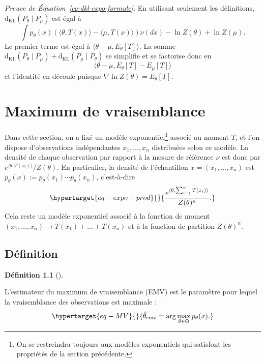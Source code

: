 \documentclass[
  10,
  letterpaper,
  DIV=11,
  numbers=noendperiod]{scrreport}
\newcommand{\dkl}{\mathrm{d}_{\mathrm{KL}}}
\newcommand{\emv}{\hat{\theta}_{\mathrm{emv}}}
\theoremstyle{plain}
\theoremstyle{definition}
\theoremstyle{plain}
\theoremstyle{definition}
\newtheorem{definition}{Définition}[chapter]
\theoremstyle{definition}
\theoremstyle{plain}
\theoremstyle{remark}
\begin{document}
\emph{Preuve de Équation~\ref{eq-dkl-expo-formule}.} En utilisant
seulement les définitions, \(\dkl(P_\theta \mid P_\mu)\) est égal à
\[\int p_\theta(x)(\langle \theta, T(x)\rangle - \langle \mu, T(x)\rangle) \nu(dx) - \ln Z(\theta) + \ln Z(\mu). \]
Le premier terme est égal à
\(\langle \theta - \mu, E_\theta[T]\rangle\). La somme
\(\dkl(P_\theta \mid P_\mu) + \dkl(P_\mu \mid P_\theta)\) se simplifie
et se factorise donc en
\[\langle \theta - \mu, E_\theta[T] - E_\mu[T]\rangle \] et l'identité
en découle puisque \(\nabla \ln Z(\theta) = E_\theta[T]\).


\hypertarget{maximum-de-vraisemblance}{%
\chapter{Maximum de vraisemblance}\label{maximum-de-vraisemblance}}

Dans cette section, on a fixé un modèle exponentiel\footnote{On se
  restreindra toujours aux modèles exponentiels qui satisfont les
  propriétés de la section précédente.} associé au moment \(T\), et l'on
dispose d'observations indépendantes \(x_1, \dotsc, x_n\) distribuées
selon ce modèle. La densité de chaque observation par rapport à la
mesure de référence \(\nu\) est donc par
\(e^{\langle \theta, T(x_i)\rangle} / Z(\theta)\). En particulier, la
densité de l'échantillon \(x=(x_1, \dotsc, x_n)\) est
\(p_\theta(x):=p_\theta(x_1)\dotsb p_\theta(x_n)\), c'est-à-dire
\begin{equation}\protect\hypertarget{eq-expo-prod}{}{ \frac{e^{\langle \theta, \sum_{i=1}^n T(x_i)\rangle}}{Z(\theta)^n}.}\label{eq-expo-prod}\end{equation}
Cela reste un modèle exponentiel associé à la fonction de moment
\((x_1, \dotsc, x_n)\to T(x_1) + \dotsc + T(x_n)\) et à la fonction de
partition \(Z(\theta)^n\).

\hypertarget{duxe9finition}{%
\section{Définition}\label{duxe9finition}}

\begin{definition}[]\protect\hypertarget{def-emv}{}\label{def-emv}

L'estimateur du maximum de vraisemblance (EMV) est le paramètre pour
lequel la vraisemblance des observations est maximale :
\begin{equation}\protect\hypertarget{eq-MV}{}{\emv = \arg \max_{\theta \in \Theta} p_\theta(x).}\label{eq-MV}\end{equation}

\end{definition}
\end{document}

